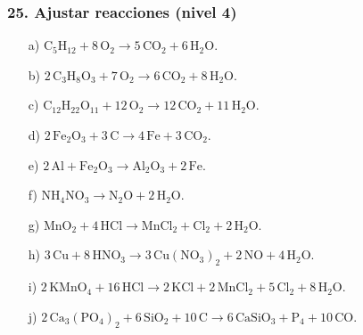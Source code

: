 \subsubsection*{25. Ajustar reacciones (nivel 4)}
\begin{enumerate}
    \item[a)] $\mathrm{C_5H_{12}}+8\,\mathrm{O_2}\rightarrow
    5\,\mathrm{CO_2}+6\,\mathrm{H_2O}$.
    \item[b)] $2\,\mathrm{C_3H_8O_3}+7\,\mathrm{O_2}\rightarrow
    6\,\mathrm{CO_2}+8\,\mathrm{H_2O}$.
    \item[c)] $\mathrm{C_{12}H_{22}O_{11}}+12\,\mathrm{O_2}\rightarrow
    12\,\mathrm{CO_2}+11\,\mathrm{H_2O}$.
    \item[d)] $2\,\mathrm{Fe_2O_3}+3\,\mathrm{C}\rightarrow
    4\,\mathrm{Fe}+3\,\mathrm{CO_2}$.
    \item[e)] $2\,\mathrm{Al}+\mathrm{Fe_2O_3}\rightarrow
    \mathrm{Al_2O_3}+2\,\mathrm{Fe}$.
    \item[f)] $\mathrm{NH_4NO_3}\rightarrow\mathrm{N_2O}+2\,\mathrm{H_2O}$.
    \item[g)] $\mathrm{MnO_2}+4\,\mathrm{HCl}\rightarrow
    \mathrm{MnCl_2}+\mathrm{Cl_2}+2\,\mathrm{H_2O}$.
    \item[h)] $3\,\mathrm{Cu}+8\,\mathrm{HNO_3}\rightarrow
    3\,\mathrm{Cu(NO_3)_2}+2\,\mathrm{NO}+4\,\mathrm{H_2O}$.
    \item[i)] $2\,\mathrm{KMnO_4}+16\,\mathrm{HCl}\rightarrow
    2\,\mathrm{KCl}+2\,\mathrm{MnCl_2}+5\,\mathrm{Cl_2}+8\,\mathrm{H_2O}$.
    \item[j)] $2\,\mathrm{Ca_3(PO_4)_2}+6\,\mathrm{SiO_2}
    +10\,\mathrm{C}\rightarrow
    6\,\mathrm{CaSiO_3}+\mathrm{P_4}+10\,\mathrm{CO}$.
\end{enumerate}


